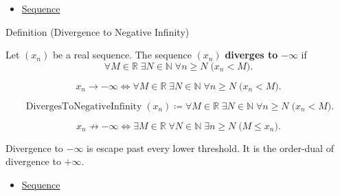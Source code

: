 \begin{remark*}[Dependencies]\hfill
\begin{itemize}
  \item \hyperref[def:sequence]{Sequence}
\end{itemize}
\end{remark*}


\begin{definitionbox}{Definition (Divergence to Negative Infinity)}
\begin{definition}
\label{def:diverges-to-negative-infinity}
Let $(x_n)$ be a real sequence. The sequence $(x_n)$ \textbf{diverges to}
$-\infty$ if
\[
  \forall M\in\mathbb{R}\;\exists N\in\mathbb{N}\;\forall n\ge N
  \;\bigl(x_n<M\bigr).
\]
\end{definition}
\end{definitionbox}

\begin{remark*}
\[
x_n\to-\infty
\Longleftrightarrow
\forall M\in\mathbb{R}\;\exists N\in\mathbb{N}\;\forall n\ge N
\;\bigl(x_n<M\bigr).
\]
\end{remark*}

\begin{remark*}
\[
\operatorname{DivergesToNegativeInfinity}(x_n)
\coloneqq
\forall M\in\mathbb{R}\;\exists N\in\mathbb{N}\;\forall n\ge N
\;\bigl(x_n<M\bigr).
\]
\end{remark*}

\begin{remark*}
\[
x_n\not\to-\infty
\Longleftrightarrow
\exists M\in\mathbb{R}\;\forall N\in\mathbb{N}\;\exists n\ge N
\;\bigl(M\le x_n\bigr).
\]
\end{remark*}

\begin{remark*}[Interpretation]
Divergence to $-\infty$ is escape past every lower threshold. It is the
order-dual of divergence to $+\infty$.
\end{remark*}

\begin{remark*}[Dependencies]\hfill
\begin{itemize}
  \item \hyperref[def:sequence]{Sequence}
\end{itemize}
\end{remark*}

